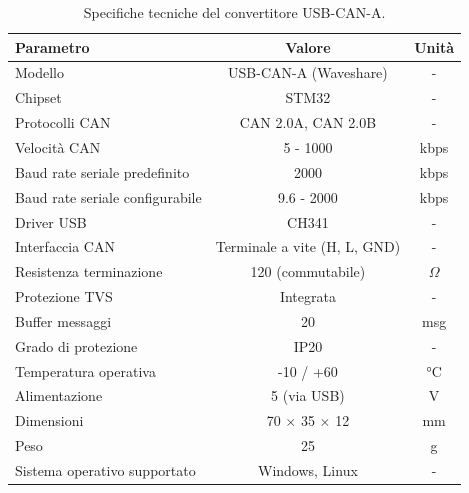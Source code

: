 \begin{table}[htbp]
    \centering
    \caption{Specifiche tecniche del convertitore USB-CAN-A.}
    \label{tab:usb_can_specs}
    \begin{tabular}{|l|c|c|}
        \hline
        \textbf{Parametro}              & \textbf{Valore}              & \textbf{Unità} \\
        \hline
        Modello                         & USB-CAN-A (Waveshare)        & -              \\
        Chipset                         & STM32                        & -              \\
        Protocolli CAN                  & CAN 2.0A, CAN 2.0B           & -              \\
        Velocità CAN                    & 5 - 1000                     & kbps           \\
        Baud rate seriale predefinito   & 2000                         & kbps           \\
        Baud rate seriale configurabile & 9.6 - 2000                   & kbps           \\
        Driver USB                      & CH341                        & -              \\
        Interfaccia CAN                 & Terminale a vite (H, L, GND) & -              \\
        Resistenza terminazione         & 120 (commutabile)            & $\Omega$       \\
        Protezione TVS                  & Integrata                    & -              \\
        Buffer messaggi                 & 20                           & msg            \\
        Grado di protezione             & IP20                         & -              \\
        Temperatura operativa           & -10 / +60                    & °C             \\
        Alimentazione                   & 5 (via USB)                  & V              \\
        Dimensioni                      & 70 $\times$ 35 $\times$ 12   & mm             \\
        Peso                            & 25                           & g              \\
        Sistema operativo supportato    & Windows, Linux               & -              \\
        \hline
    \end{tabular}
\end{table}

